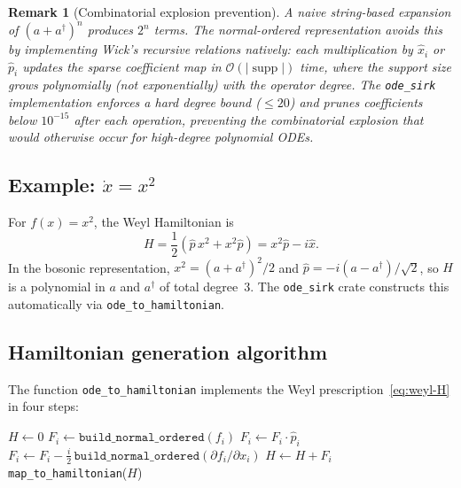 \documentclass[11pt,a4paper]{article}
\newtheorem{remark}{Remark}
\begin{document}
\begin{remark}[Combinatorial explosion prevention]
A naive string-based expansion of $(a+a^{\dagger})^{n}$ produces $2^{n}$
terms.  The normal-ordered representation avoids this by implementing
Wick's recursive relations \emph{natively}: each multiplication by
$\hat{x}_{i}$ or $\hat{p}_{i}$ updates the sparse coefficient map in
$\mathcal{O}(\lvert\operatorname{supp}\rvert)$ time, where the support
size grows polynomially (not exponentially) with the operator degree.
The \texttt{ode\_sirk} implementation enforces a hard degree bound
($\leq 20$) and prunes coefficients below $10^{-15}$ after each
operation, preventing the combinatorial explosion that would otherwise
occur for high-degree polynomial ODEs.
\end{remark}

\subsection{Example: $\dot{x}=x^{2}$}

For $f(x)=x^{2}$, the Weyl Hamiltonian is
\begin{equation}\label{eq:H-x2}
  H=\frac{1}{2}(\hat{p}\,x^{2}+x^{2}\hat{p})
  =x^{2}\hat{p}-i\hat{x}.
\end{equation}
In the bosonic representation, $x^{2}=(a+a^{\dagger})^{2}/2$ and
$\hat{p}=-i(a-a^{\dagger})/\sqrt{2}$, so $H$ is a polynomial in $a$ and
$a^{\dagger}$ of total degree~3.  The \texttt{ode\_sirk} crate
constructs this automatically via \texttt{ode\_to\_hamiltonian}.

\subsection{Hamiltonian generation algorithm}

The function \texttt{ode\_to\_hamiltonian} implements the Weyl
prescription~\eqref{eq:weyl-H} in four steps:

\begin{algorithm}[H]
\caption{Weyl quantization (\texttt{ode\_to\_hamiltonian})}
\begin{algorithmic}[1]
\State $H\gets 0$ 
  \State $F_{i}\gets\texttt{build\_normal\_ordered}(f_{i})$
  \State $F_{i}\gets F_{i}\cdot\hat{p}_{i}$
  \State $F_{i}\gets F_{i}-\tfrac{i}{2}\,
    \texttt{build\_normal\_ordered}(\partial f_{i}/\partial x_{i})$
  \State $H\gets H+F_{i}$
\EndFor
\State \Return \texttt{map\_to\_hamiltonian}($H$)
\end{algorithmic}
\end{algorithm}
\end{document}
